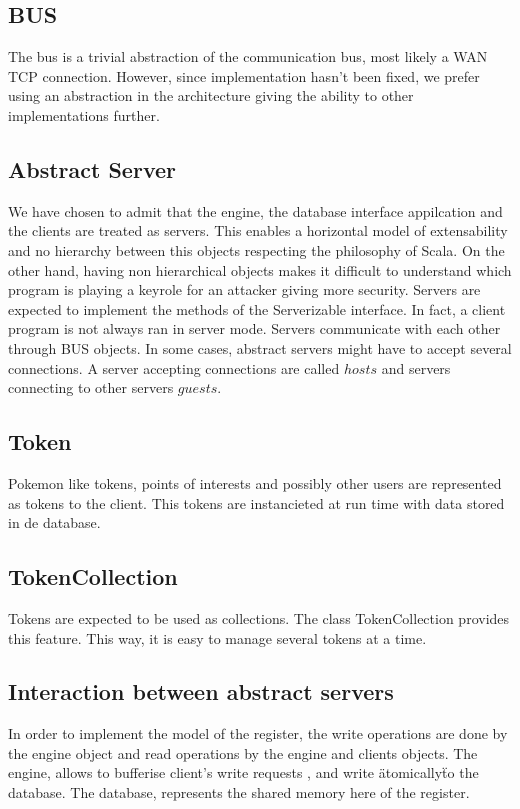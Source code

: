 \documentclass[a4paper,09pt]{article}
\begin{document}
\subsection{BUS}
The bus is a trivial abstraction of the communication bus, most likely a WAN TCP connection. However, since implementation hasn't been fixed, we prefer using an abstraction in the architecture giving the ability to other implementations further.
\subsection{Abstract Server}
We have chosen to admit that the engine, the database interface appilcation and  the clients are treated as servers. This enables a horizontal model of extensability and no hierarchy between this objects respecting the philosophy of Scala. On the other hand, having non hierarchical objects makes it difficult to understand which program is playing a keyrole for an attacker giving more security. Servers are expected to implement the methods of the Serverizable interface. In fact, a client program is not always ran in server mode. Servers communicate with each other through BUS objects. In some cases, abstract servers might have to accept several connections. A server accepting connections are called $hosts$ and servers connecting to other servers $guests$.

\subsection{Token}
Pokemon like tokens, points of interests and possibly other users are represented as tokens to the client. This tokens are instancieted at run time with data stored in de database.

\subsection{TokenCollection}
Tokens are expected to be used as collections. The class TokenCollection provides this feature. This way, it is easy to manage several tokens at a time.

\subsection{Interaction between abstract servers}
In order to implement the  model of the register, the write operations are done by the engine object and read operations by the engine and clients objects. The engine, allows to bufferise client's write requests , and write \"atomically\" to the database. The database, represents the shared memory here of the register.
\end{document}
